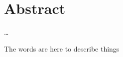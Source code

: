 \chapter{Abstract}                                 \label{ch:abstract}

\ldots

\instructionsabstract
The words are here to describe things

\cleardoublepage

